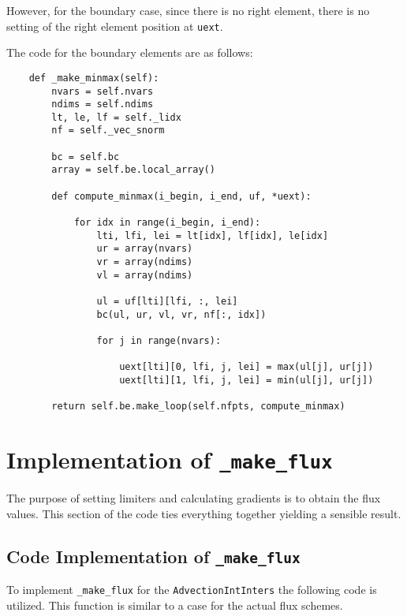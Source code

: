 \documentclass[a4paper, 12pt]{article}
\begin{document}
However, for the boundary case, since there is no right element, there is no setting of the right element position at \verb|uext|.\\\par

The code for the boundary elements are as follows:
\begin{verbatim}
    def _make_minmax(self):
        nvars = self.nvars
        ndims = self.ndims
        lt, le, lf = self._lidx
        nf = self._vec_snorm

        bc = self.bc
        array = self.be.local_array()

        def compute_minmax(i_begin, i_end, uf, *uext):

            for idx in range(i_begin, i_end):
                lti, lfi, lei = lt[idx], lf[idx], le[idx]
                ur = array(nvars)
                vr = array(ndims)
                vl = array(ndims)

                ul = uf[lti][lfi, :, lei]
                bc(ul, ur, vl, vr, nf[:, idx])

                for j in range(nvars):

                    uext[lti][0, lfi, j, lei] = max(ul[j], ur[j])
                    uext[lti][1, lfi, j, lei] = min(ul[j], ur[j])

        return self.be.make_loop(self.nfpts, compute_minmax)
\end{verbatim}

\section{Implementation of \texttt{\_make\_flux}}

The purpose of setting limiters and calculating gradients is to obtain the flux values. This section of the code ties everything together yielding a sensible result.

\subsection{Code Implementation of \texttt{\_make\_flux}} 

To implement \verb|_make_flux| for the \verb|AdvectionIntInters| the following code is utilized. This function is similar to a case for the actual flux schemes. \\\par 
\end{document}
